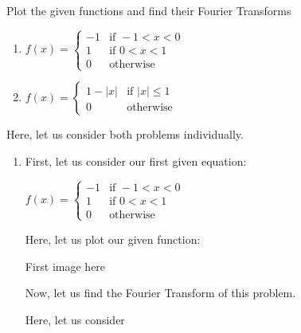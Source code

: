 \item Plot the given functions and find their Fourier Transforms
%
\begin{enumerate}
  \item
  $\displaystyle
  f(x) =
  \begin{cases}
    -1 & \text{if } -1 < x < 0\\
    1 &  \text{if } 0 < x < 1\\
    0 & \text{otherwise}
  \end{cases}
  $
  \item
  $\displaystyle
  f(x) =
  \begin{cases}
    1 - |x| & \text{if } |x| \leq 1\\
    0 & \text{otherwise}
  \end{cases}
  $
\end{enumerate}

\bigbreak

Here, let us consider both problems individually.

\begin{enumerate}
  \item First, let us consider our first given equation:
  
  $\displaystyle
  f(x) =
  \begin{cases}
    -1 & \text{if } -1 < x < 0\\
    1 &  \text{if } 0 < x < 1\\
    0 & \text{otherwise}
  \end{cases}
  $

  Here, let us plot our given function:

  \begin{center}
    First image here%
  \end{center}

  Now, let us find the Fourier Transform of this problem.

  Here, let us consider
\end{enumerate}
